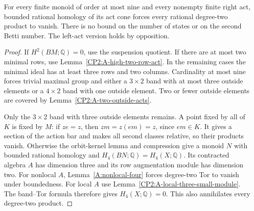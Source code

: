 \begin{theorem}
\label{CP2:A-bounded-nine-acts}
For every finite monoid of order at most nine and every
nonempty finite right act, bounded rational homology
of its act cone forces every rational degree-two
product to vanish. There is no bound on the number
of states or on the second Betti number. The left-act
version holds by opposition.
\end{theorem}
\begin{proof}
If $H^2(BM;\mathbb Q)=0$, use the suspension quotient.
If there are at most two minimal rows, use
Lemma~\ref{CP2:A-high-two-row-act}. In the remaining
cases the minimal ideal has at least three rows and
two columns. Cardinality at most nine forces trivial
maximal group and either a $3\times2$ band with
at most three outside elements or a $4\times2$
band with one outside element. Two or fewer outside
elements are covered by Lemma~\ref{CP2:A-two-outside-acts}.

Only the $3\times2$ band with three outside elements
remains. A point fixed by all of $K$ is fixed by $M$:
if $ze=z$, then $zm=z(em)=z$, since $em\in K$.
It gives a section of the action bar and makes
all second classes relative, so their products vanish.
Otherwise the orbit-kernel lemma and compression give
a monoid $N$ with bounded rational homology and
$H_4(BN;\mathbb Q)=H_4(X;\mathbb Q)$. Its contracted
algebra $A$ has dimension three and its row
augmentation module has dimension two. For nonlocal
$A$, Lemma~\ref{A:nonlocal-four} forces degree-two
Tor to vanish under boundedness. For local $A$ use
Lemma~\ref{CP2:A-local-three-small-module}. The
band--Tor formula therefore gives $H_4(X;\mathbb Q)=0$.
This also annihilates every degree-two product.
\end{proof}

